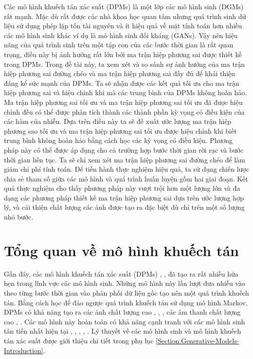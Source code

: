 \documentclass[14pt, a4paper]{article}
\numberwithin{equation}{section}
\numberwithin{figure}{section}
\numberwithin{dl}{section}
\numberwithin{md}{section}
\numberwithin{bd}{section}
\numberwithin{dn}{section}
\numberwithin{hq}{section}
\begin{document}
    Các mô hình khuếch tán xác suất (DPMs) là một lớp các mô hình sinh (DGMs) rất mạnh.
    Mặc dù rất được các nhà khoa học quan tâm nhưng quá trình sinh dữ liệu sử dụng phép lặp tốn tài nguyên và ít hiệu quả về mặt tính toán hơn nhiều các mô hình sinh khác ví dụ là mô hình sinh đối kháng (GANs).
    Vậy nên hiệu năng của quá trình sinh trên một tập con của các bước thời gian là rất quan trọng,
    điều này bị ảnh hưởng rất lớn bởi ma trận hiệp phương sai được thiết kế trong DPMs.
    Trong đề tài này, ta xem xét và so sánh sự ảnh hưởng của ma trận hiệp phương sai đường chéo và ma trận hiệp phương sai đầy đủ để khải thiện đáng kể sức mạnh của DPMs.
    Ta sẽ nhận được các kết quả tối ưu cho ma trận hiệp phương sai và hiệu chỉnh khi mà các trung bình của DPMs không hoàn hảo.
    Ma trận hiệp phương sai tối ưu và ma trận hiệp phương sai tối ưu đã được hiệu chỉnh đều có thể được phân tích thành các thành phần kỳ vọng có điều kiện của các hàm của nhiễu.
    Dựa trên điều này ta sẽ đề xuất ước lượng ma trận hiệp phương sao tối ưu và ma trận hiệp phương sai tối ưu được hiệu chỉnh khi biết trung bình không hoàn hảo bằng cách học các kỳ vọng có điều kiện.
    Phương pháp này có thể được áp dụng cho cả trường hợp bước thời gian rời rạc và bước thời gian liên tục.
    Ta sẽ chỉ xem xét ma trận hiệp phương sai đường chéo để làm giảm chi phí tính toán.
    Để tiến hành thực nghiệm hiệu quả, ta sử dụng chiến lược chia sẻ tham số giữa các mô hình và quá trình huấn luyện gồm hai giai đoạn.
    Kết quả thực nghiệm cho thấy phương pháp này vượt trội hơn một lượng lớn và đa dạng các phương pháp thiết kế ma trận hiệp phương sai dựa trên ước lượng hợp lý,
    và cải thiện chất lượng các ảnh được tạo ra đặc biệt dù chỉ trên một số lượng nhỏ bước.
    

        
    \newpage

    \section{Tổng quan về mô hình khuếch tán} \label{Introduction}

    Gần đây, các mô hình khuếch tán xác suất (DPMs) \cite{sohl2015deep}, \cite{ho2020denoising}, \cite{song2020score} đã tạo ra rất nhiều hứa hẹn trong lĩnh vực các mô hình sinh.
    Những mô hình này lần lượt đưa nhiễu vào theo từng bước thời gian vào phân phối dữ liệu gốc tạo nên một quá trình khuếch tán.
    Bằng cách học để đảo ngược quá trình khuếch tán sử dụng mô hình Markov, DPMs có khả năng tạo ra các ảnh chất lượng cao \cite{ho2020denoising}, \cite{song2020score}, \cite{dhariwal2021diffusion},
    các âm thanh chất lượng cao \cite{chen2020wavegrad}, \cite{kong2020diffwave}. 
    Các mô hình này hoàn toàn có khả năng cạnh tranh với các mô hình sinh tân tiến nhất hiện tại \cite{brock2018large}, \cite{wu2019logan}, \cite{karras2020analyzing}, \cite{binkowski2019high}, \cite{kalchbrenner2018efficient}.
    Lý thuyết về các mô hình sinh và mô hình khuếch tán xác suất được giới thiệu chi tiết trong phụ lục \ref{Section:Generative-Models-Introduction}.
\end{document}
